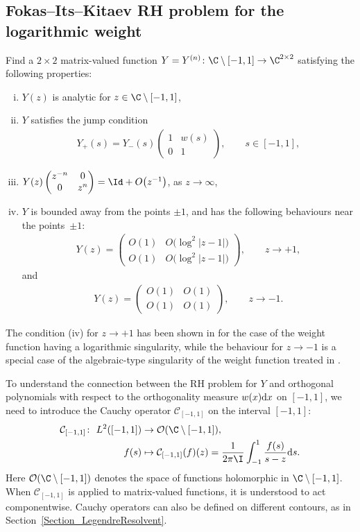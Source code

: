\subsection{Fokas--Its--Kitaev RH problem for the logarithmic weight}
Find a $2\times2$ matrix-valued function $Y = Y^{(n)} \colon \C \setminus [-1,1] \to \C^{2\times2}$ satisfying the following properties:
\begin{enumerate}[(i)]\itemsep=0pt
 \item $Y(z)$ is analytic for $z \in \C \setminus [-1,1]$,
 \item $Y$ satisfies the jump condition
 \begin{align*}
 Y_+(s) = Y_-(s) \begin{pmatrix}
 1 & w(s)
 \\
 0 & 1
 \end{pmatrix}, \qquad s\in [-1,1],
 \end{align*}
\item $Y(z)\begin{pmatrix}
z^{-n} & 0
\\
0 & z^n
\end{pmatrix} = \Id + O\big(z^{-1}\big)$, as $z \rightarrow \infty$,
\item $Y$ is bounded away from the points $\pm 1$, and has the following behaviours near the points~$\pm1$:
\begin{align*}
 Y(z) = \begin{pmatrix}
 O(1) & O\big(\log^2|z-1|\big)
 \\
 O(1) & O\big(\log^2|z-1|\big)
 \end{pmatrix}, \qquad z\to +1,
\end{align*}
and
\begin{align*}
 Y(z) = \begin{pmatrix}
 O(1) & O(1)
 \\
 O(1) & O(1)
 \end{pmatrix}, \qquad z \to -1.
\end{align*}
\end{enumerate}
The condition (iv) for $z \to +1$ has been shown in \cite[Section~3.1]{CD} for the case of the weight function having a logarithmic singularity, while the behaviour for $z \to -1$ is a special case of the algebraic-type singularity of the weight function treated in \cite[Section~2]{KMVV}.

To understand the connection between the RH problem for $Y$ and orthogonal polynomials with respect to the orthogonality measure $w(x){\rm d}x$ on $[-1,1]$, we need to introduce the Cauchy operator $\mathcal C_{[-1,1]}$ on the interval $[-1,1]$:
\begin{align*}
 \mathcal C_{[-1,1]}\colon\ L^2([-1,1])&\to \mathcal O(\C \setminus [-1,1]),
 \\
 f(s) &\mapsto \mathcal C_{[-1,1]}(f)(z) = \frac{1}{2\pi\I} \int_{-1}^1 \frac{f(s)}{s-z} {\rm d}s.
\end{align*}
Here $\mathcal O(\C \setminus [-1,1])$ denotes the space of functions holomorphic in $\C \setminus [-1,1]$. When $\mathcal C_{[-1,1]}$ is applied to matrix-valued functions, it is understood to act componentwise. Cauchy operators can also be defined on different contours, as in Section~\ref{Section_LegendreResolvent}.

